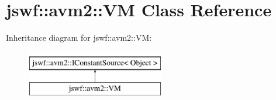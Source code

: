 \hypertarget{classjswf_1_1avm2_1_1_v_m}{\section{jswf\+:\+:avm2\+:\+:V\+M Class Reference}
\label{classjswf_1_1avm2_1_1_v_m}
}
Inheritance diagram for jswf\+:\+:avm2\+:\+:V\+M\+:\begin{figure}[H]
\begin{center}
\leavevmode
\includegraphics[height=2.000000cm]{classjswf_1_1avm2_1_1_v_m}
\end{center}
\end{figure}
